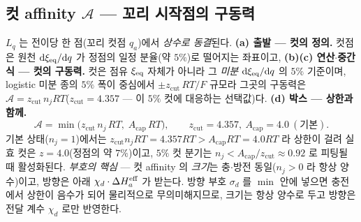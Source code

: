 \subsection{컷 affinity $\mathcal A$ --- 꼬리 시작점의 구동력}\label{sec:lag-cut}
$L_q$ 는 전이당 한 점(꼬리 컷점 $q_a$)에서 \emph{상수로 동결}된다. \textbf{(a) 출발 --- 컷의 정의.} 컷점은 원천
$\mathrm{d}\xi_{\mathrm{eq}}/\mathrm{d} q$ 가 정점의 일정 분율(약 $5\%$)로 떨어지는 좌표이고, \textbf{(b)(c) 연산$\cdot$중간식 --- 컷의 구동력.}
컷은 점유 $\xi_{\mathrm{eq}}$ 자체가 아니라 그 \emph{미분} $\mathrm{d}\xi_{\mathrm{eq}}/\mathrm{d} q$ 의 $5\%$ 기준이며, logistic 미분 종의 $5\%$
폭이 중심에서 $\pm z_\mathrm{cut}\,RT/F$ 규모라 그곳의 구동력은 $\mathcal A=z_\mathrm{cut}\,n_jRT$($z_\mathrm{cut}=4.357$
--- 이 $5\%$ 컷에 대응하는 선택값)다. \textbf{(d) 박스 --- 상한과 함께.}
\begin{equation}
\mathcal A=\min\!\big(z_\mathrm{cut}\,n_j\,RT,\;A_\mathrm{cap}\,RT\big),
\qquad z_\mathrm{cut}=4.357,\ A_\mathrm{cap}=4.0\ (\text{기본}).
\label{eq:Acut}
\end{equation}
기본 상태($n_j{=}1$)에서는 $z_\mathrm{cut}n_jRT=4.357RT>A_\mathrm{cap}RT=4.0RT$ 라 상한이 걸려 실효
컷은 $z=4.0$(정점의 약 $7\%$)이고, $5\%$ 컷 분기는 $n_j<A_\mathrm{cap}/z_\mathrm{cut}\approx0.92$ 로
피팅될 때 활성화된다.
\emph{부호의 핵심} --- 컷 affinity 의 \emph{크기}는
충$\cdot$방전 동일($n_j>0$ 라 항상 양수)이고, 방향은 아래 $\chi_d\cdot\Delta H_a^{\mathrm{eff}}$ 가 받는다. 방향 부호 $\sigma_d$ 를
$\min$ 안에 넣으면 충전에서 상한이 음수가 되어 물리적으로 무의미해지므로, 크기는 항상 양수로 두고 방향은 전달
계수 $\chi_d$ 로만 반영한다.

